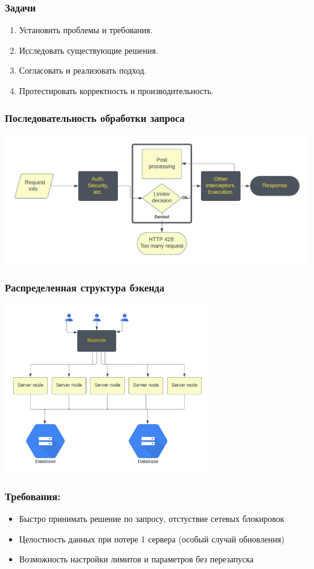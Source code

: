 \documentclass[14pt,aspectratio=169,hyperref={pdftex,unicode},xcolor=dvipsnames]{beamer}
\begin{document}
\begin{frame}
\frametitle{Задачи}
\begin{enumerate}
\item Установить проблемы и требования.
\item Исследовать существующие решения.
\item Согласовать и реализовать подход.
\item Протестировать корректность и производительность.
\end{enumerate}
\end{frame}

\begin{frame}
\frametitle{Последовательность обработки запроса}
\begin{center}
\includegraphics[width=14cm]{images/interceptor.png}
\end{center}
\end{frame}


\begin{frame}
\frametitle{Распределенная структура бэкенда}
\begin{center}
\includegraphics[width=9cm]{images/dist.png}
\end{center}
\end{frame}


\begin{frame}
\frametitle{Требования:}
\begin{itemize}
\item Быстро принимать решение по запросу, отстуствие сетевых блокировок
\item Целостность данных при потере 1 сервера (особый случай обновления)
\item Возможность настройки лимитов и параметров без перезапуска
\end{itemize}
\end{frame}
\end{document}
